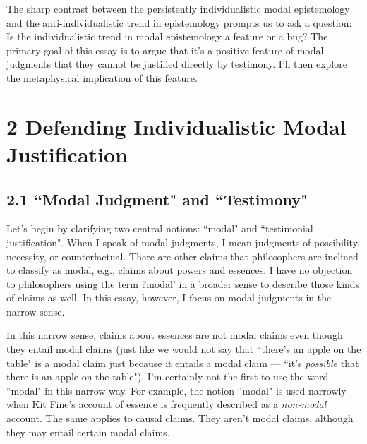 \documentclass[a4paper,12pt]{article}
\begin{document}
The sharp contrast between the persistently individualistic modal epistemology and the anti-individualistic trend in epistemology prompts us to ask a question: Is the individualistic trend in modal epistemology a feature or a bug? The primary goal of this essay is to argue that it's a positive feature of modal judgments that they cannot be justified directly by testimony. I'll then explore the metaphysical implication of this feature.

\section*{2 Defending Individualistic Modal Justification}
\subsection*{2.1 ``Modal Judgment" and ``Testimony"}
Let's begin by clarifying two central notions: ``modal" and ``testimonial justification". When I speak of modal judgments, I mean judgments of possibility, necessity, or counterfactual. There are other claims that philosophers are inclined to classify as modal, e.g., claims about powers and essences. I have no objection to philosophers using the term ?modal' in a broader sense to describe those kinds of claims as well. In this essay, however, I focus on modal judgments in the narrow sense.

In this narrow sense, claims about essences are not modal claims even though they entail modal claims (just like we would not say that ``there's an apple on the table" is a modal claim just because it entails a modal claim --- ``it's \emph{possible} that there is an apple on the table"). I'm certainly not the first to use the word ``modal" in this narrow way. For example, the notion ``modal" is used narrowly when Kit Fine's account of essence is frequently described as a \emph{non-modal} account. The same applies to causal claims. They aren't modal claims, although they may entail certain modal claims.\footnotemark
\end{document}
